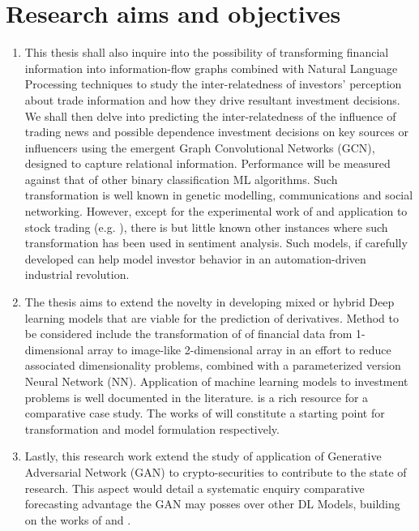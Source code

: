 \documentclass[a4paper,11pt]{scrartcl}
\begin{document}
\section{Research aims and objectives}
\begin{enumerate}
    \item This thesis shall also inquire into the possibility of transforming financial information into information-flow graphs combined with Natural Language Processing techniques to study the inter-relatedness of investors' perception about trade information and how they drive resultant investment decisions. We shall then delve into predicting the inter-relatedness of the influence of trading news and possible dependence investment decisions on key sources or influencers using the emergent  Graph Convolutional Networks (GCN), designed to capture relational information. Performance will be  measured against that of other binary classification ML algorithms.
          Such transformation is well known in genetic modelling, communications and social networking. However, except for the experimental work of  \cite{weber2019anti} and application to stock trading (e.g. \cite{chen2018incorporating,wang2019alphastock}), there is but little known other instances where such transformation has been used in sentiment analysis. Such models, if carefully developed can help model investor behavior in an automation-driven industrial revolution. \label{obj_1}
    \item The thesis aims to extend the novelty in developing mixed or hybrid Deep learning models that are viable for the prediction of derivatives. Method to be considered include the transformation of of financial data from 1-dimensional array to image-like 2-dimensional array in an effort to reduce associated dimensionality problems, combined with a parameterized version Neural Network (NN). Application of machine learning models to investment problems is well documented in the literature. \cite{ozbayoglu2020deep} is a rich resource for a comparative case study. The works of \cite{culkin2017machine, sezer2020financial} will constitute a starting point for transformation and model formulation respectively. \label{obj_2}
    \item Lastly, this research work extend the study of application of Generative Adversarial Network (GAN) to crypto-securities to contribute to the state of research. This aspect would detail a systematic enquiry comparative forecasting advantage the GAN may posses over other DL Models, building on the works of \cite{zola2020generative} and \cite{grilli2020generative}. \label{obj_3}
\end{enumerate}
\end{document}
